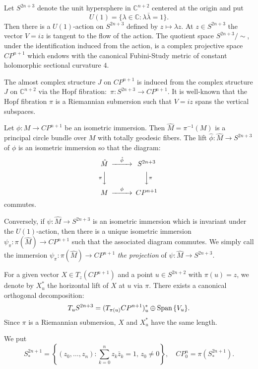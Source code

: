\documentclass{amsart}
\theoremstyle{plain}
\numberwithin{equation}{section}
\theoremstyle{remark}
\numberwithin{equation}{section}
\begin{document}
 Let $S^{2n+3}$ denote the unit hypersphere in  ${\mathbb C}^{n+2}$ centered at the origin and put $$U(1)=\{\lambda\in {\mathbb C}:\lambda\bar\lambda=1\}.$$ Then there is a $U(1)$-action on $S^{2n+3}$ defined by $z\mapsto \lambda z$. At $z\in S^{2n+3}$ the vector $V=iz$ is tangent to the flow of the action. The quotient space $S^{2n+3}/\sim$, under the identification induced from the action, is a complex projective space $ CP^{n+1}$ which endows with the canonical Fubini-Study metric of constant holomorphic sectional curvature $4$. 
 
 The almost complex structure $J$ on $ CP^{n+1}$ is induced from the complex structure $J$ on ${\mathbb C}^{n+2}$ via the Hopf fibration: $\,\pi : S^{2n+3}\to CP^{n+1}$. It is well-known that the Hopf fibration $\pi$ is a Riemannian submersion such that $V=iz$ spans the vertical subspaces. 

Let $\phi:M\to CP^{n+1}$ be an isometric immersion. Then $\hat M=\pi^{-1}(M)$ is a principal circle bundle over $M$ with totally geodesic fibers. The lift $\hat \phi:\hat M\to S^{2n+3}$ of $\phi$ is an isometric immersion so that the diagram:
\[\label{E:5.b} \begin{CD} \hat M @>\hat \phi >>S^{2n+3}\\ @V{\pi}VV @VV{\pi}V\\ M @> \phi>>  CP^{n+1}\end{CD} \]
commutes.
 
Conversely, if $\psi:\hat M \to S^{2n+3}$ is an isometric immersion which is invariant under the $U(1)$-action, then there is a unique isometric immersion $\psi_\pi:\pi(\hat M)\to CP^{n+1}$ such that the associated diagram commutes. We simply call the immersion $\psi_\pi:\pi(\hat M)\to CP^{n+1}$ {\it the projection} of $\psi:\hat M\to S^{2n+3}$.

For a given  vector $X\in T_z(CP^{n+1})$ and a point $u\in S^{2n+2}$ with $\pi(u)=z$, we denote by $X_u^*$ the horizontal lift of $X$ at $u$ via $\pi.$ There exists  a canonical orthogonal decomposition:
\begin{equation}T_u S^{2n+3}=(T_{\pi(u)}CP^{n+1})_u^*\oplus
\hbox{\rm Span}\,\{V_u\}.\end{equation}
Since $\pi$ is a Riemannian  submersion, $X$ and  $X^*_u$ have the same length.

We put
\begin{equation}S_*^{2n+1}=\left\{(z_0,\ldots,z_n):\sum_{k=0}^n
z_k\bar z_k=1,\, z_0\ne 0\right\},\quad CP^n_0=\pi(S_*^{2n+1}).\end{equation}
\end{document}
